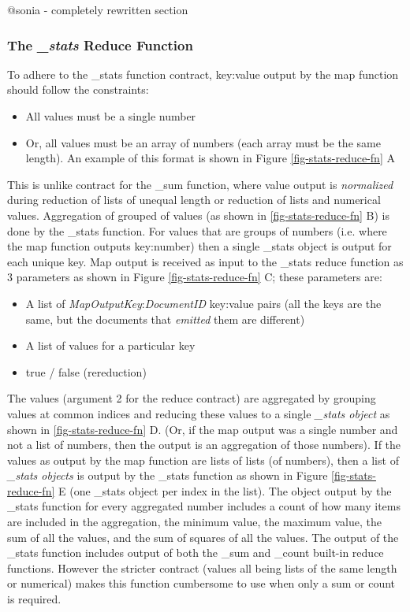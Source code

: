 

@sonia - completely rewritten section
\subsubsection{The \textit{\_stats} Reduce Function}
To adhere to the \_stats function contract, key:value output by the map function should follow the constraints:

\begin{itemize}
    \item All values must be a single number
    \item Or, all values must be an array of numbers (each array must be the same length). An example of this format is shown in Figure \ref{fig-stats-reduce-fn} A
\end{itemize}

This is unlike contract for the \_sum function, where value output is \textit{normalized} during reduction of lists of unequal length or reduction of lists and numerical values. Aggregation of grouped of values (as shown in \ref{fig-stats-reduce-fn} B) is done by the \_stats function. For values that are groups of numbers (i.e. where the map function outputs key:number) then a single \_stats object is output for each unique key. Map output is received as input to the \_stats reduce function as 3 parameters as shown in Figure \ref{fig-stats-reduce-fn} C; these parameters are:

\begin{itemize}
    \item A list of \textit{MapOutputKey}:\textit{DocumentID} key:value pairs (all the keys are the same, but the documents that \textit{emitted} them are different)
    \item A list of values for a particular key
    \item true / false (rereduction)
\end{itemize}

The values (argument 2 for the reduce contract) are aggregated by grouping values at common indices and reducing these values to a single \textit{\_stats object} as shown in \ref{fig-stats-reduce-fn} D. (Or, if the map output was a single number and not a list of numbers, then the output is an aggregation of those numbers). If the values as output by the map function are lists of lists (of numbers), then a list of \textit{\_stats objects} is output by the \_stats function as shown in Figure \ref{fig-stats-reduce-fn} E (one \_stats object per index in the list). The object output by the \_stats function for every aggregated number includes a count of how many items are included in the aggregation, the minimum value, the maximum value, the sum of all the values, and the sum of squares of all the values. The output of the \_stats function includes output of both the \_sum and \_count built-in reduce functions. However the stricter contract (values all being lists of the same length or numerical) makes this function cumbersome to use when only a sum or count is required.


